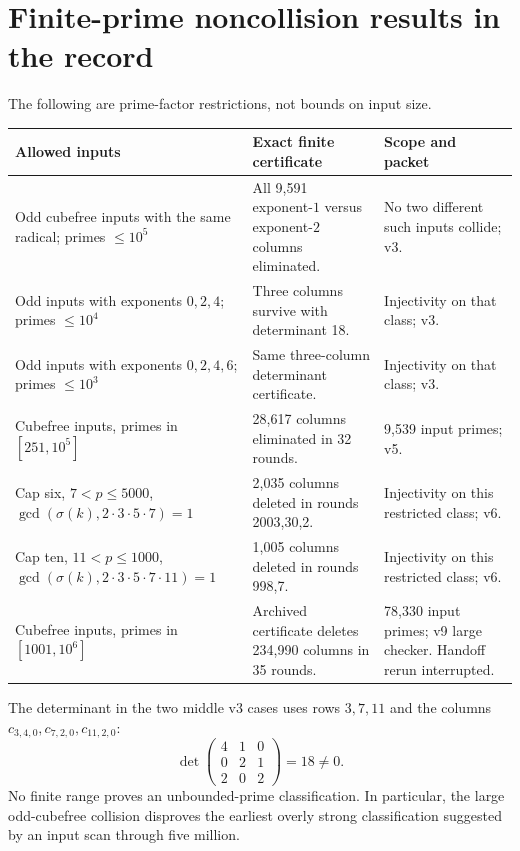 \section{Finite-prime noncollision results in the record}
The following are prime-factor restrictions, not bounds on input size.
\small
\begin{longtable}{@{}p{}p{}p{}@{}}
\toprule Allowed inputs & Exact finite certificate & Scope and packet\\\midrule\endhead
Odd cubefree inputs with the same radical; primes $\le10^5$ & All 9,591 exponent-$1$ versus exponent-$2$ columns eliminated. & No two different such inputs collide; v3.\\
Odd inputs with exponents $0,2,4$; primes $\le10^4$ & Three columns survive with determinant 18. & Injectivity on that class; v3.\\
Odd inputs with exponents $0,2,4,6$; primes $\le10^3$ & Same three-column determinant certificate. & Injectivity on that class; v3.\\
Cubefree inputs, primes in $[251,10^5]$ & 28,617 columns eliminated in 32 rounds. & 9,539 input primes; v5.\\
Cap six, $7<p\le5000$, $\gcd(\sigma(k),2\cdot3\cdot5\cdot7)=1$ & 2,035 columns deleted in rounds 2003,30,2. & Injectivity on this restricted class; v6.\\
Cap ten, $11<p\le1000$, $\gcd(\sigma(k),2\cdot3\cdot5\cdot7\cdot11)=1$ & 1,005 columns deleted in rounds 998,7. & Injectivity on this restricted class; v6.\\
Cubefree inputs, primes in $[1001,10^6]$ & Archived certificate deletes 234,990 columns in 35 rounds. & 78,330 input primes; v9 large checker. Handoff rerun interrupted.\\
\bottomrule
\end{longtable}\normalsize
The determinant in the two middle v3 cases uses rows $3,7,11$ and the columns
$c_{3,4,0},c_{7,2,0},c_{11,2,0}$:
\[
 \det\begin{pmatrix}4&1&0\\0&2&1\\2&0&2\end{pmatrix}=18\ne0.
\]
No finite range proves an unbounded-prime classification. In particular, the
large odd-cubefree collision disproves the earliest overly strong classification
suggested by an input scan through five million.

